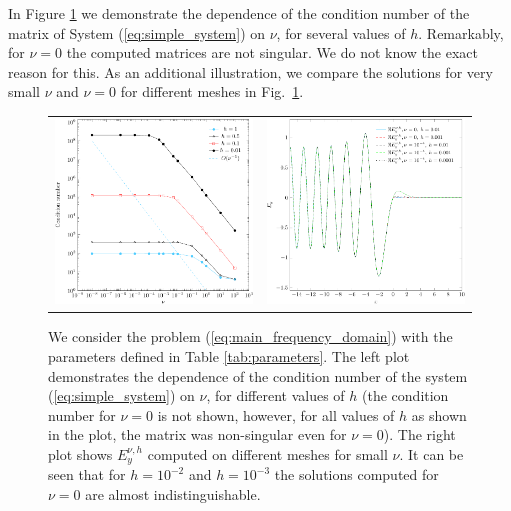 In Figure \ref{fig:small_nu} we demonstrate the dependence of the condition number of the matrix of System (\ref{eq:simple_system}) 
on $\nu$, for several values of $h$.
Remarkably, for $\nu=0$ the computed matrices are not singular. We do not know the exact reason for this.
As an additional illustration, we compare the solutions for very small $\nu$ and $\nu=0$ for different meshes in Fig.~\ref{fig:small_nu}. 
\begin{figure}[htb!]
\begin{tabular}{cc}
\includegraphics[height=0.32\textwidth]{pics_frequency_domain/fig_cond_num.pdf}&
 \includegraphics[height=0.32\textwidth]{pics_frequency_domain/ey_resonance.pdf}
 \end{tabular}
 \caption{
 We consider the problem (\ref{eq:main_frequency_domain}) with the parameters 
defined in Table \ref{tab:parameters}. The left plot demonstrates the dependence of the condition number of the system (\ref{eq:simple_system}) on $\nu$, for different values of $h$ (the condition 
 number for $\nu=0$ is not shown, however, for all values of $h$ as shown in the plot, the matrix was non-singular even for $\nu=0$). 
 The right plot shows $E_{y}^{\nu,h}$ computed on different meshes for small $\nu$. It can be seen that for $h=10^{-2}$ and $h=10^{-3}$ the solutions 
 computed for $\nu=0$ are almost indistinguishable.}
 \label{fig:small_nu}
\end{figure}
